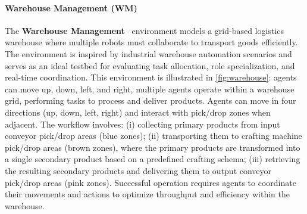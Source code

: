 \documentclass[pdflatex,sn-mathphys-num]{sn-jnl}%
\theoremstyle{thmstyleone}%
\theoremstyle{thmstyletwo}%
\theoremstyle{thmstylethree}%
\begin{document}
\paragraph*{Warehouse Management (WM)}
The \textbf{Warehouse Management}~\cite{warehouse_management} environment models a grid-based logistics warehouse where multiple robots must collaborate to transport goods efficiently. The environment is inspired by industrial warehouse automation scenarios and serves as an ideal testbed for evaluating task allocation, role specialization, and real-time coordination. This environment is illustrated in \autoref{fig:warehouse}: agents can move up, down, left, and right, multiple agents operate within a warehouse grid, performing tasks to process and deliver products. Agents can move in four directions (up, down, left, right) and interact with pick/drop zones when adjacent. The workflow involves: (i) collecting primary products from input conveyor pick/drop areas (blue zones); (ii) transporting them to crafting machine pick/drop areas (brown zones), where the primary products are transformed into a single secondary product based on a predefined crafting schema; (iii) retrieving the resulting secondary products and delivering them to output conveyor pick/drop areas (pink zones). Successful operation requires agents to coordinate their movements and actions to optimize throughput and efficiency within the warehouse.
%
\end{document}
